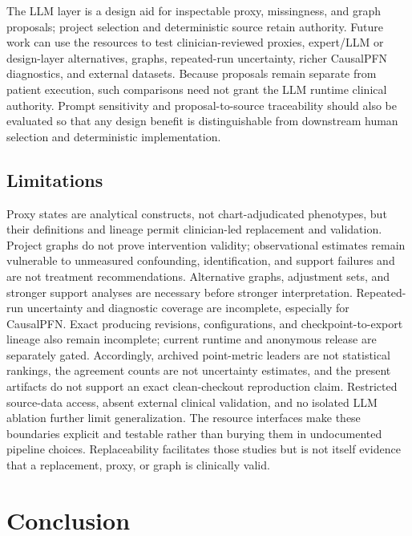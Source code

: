 \documentclass[letterpaper]{article}
\begin{document}
The LLM layer is a design aid for inspectable proxy, missingness, and graph
proposals; project selection and deterministic source retain authority. Future
work can use the resources to test clinician-reviewed proxies, expert/LLM or
design-layer alternatives, graphs, repeated-run uncertainty, richer CausalPFN
diagnostics, and external datasets. Because proposals remain separate from
patient execution, such comparisons need not grant the LLM runtime clinical
authority. Prompt sensitivity and proposal-to-source traceability should also be
evaluated so that any design benefit is distinguishable from downstream human
selection and deterministic implementation.

\subsection{Limitations}

Proxy states are analytical constructs, not chart-adjudicated phenotypes, but
their definitions and lineage permit clinician-led replacement and validation.
Project graphs do not prove intervention validity; observational estimates
remain vulnerable to unmeasured confounding, identification, and support
failures and are not treatment recommendations. Alternative graphs, adjustment
sets, and stronger support analyses are necessary before stronger
interpretation. Repeated-run uncertainty and diagnostic coverage are incomplete,
especially for CausalPFN. Exact producing
revisions, configurations, and checkpoint-to-export lineage also remain
incomplete; current runtime and anonymous release are separately gated.
Accordingly, archived point-metric leaders are not statistical rankings, the
agreement counts are not uncertainty estimates, and the present artifacts do
not support an exact clean-checkout reproduction claim.
Restricted source-data access, absent external clinical validation, and no
isolated LLM ablation further limit generalization. The resource interfaces make
these boundaries explicit and testable rather than burying them in undocumented
pipeline choices. Replaceability facilitates those studies but is not itself
evidence that a replacement, proxy, or graph is clinically valid.

\section{Conclusion}
\end{document}
